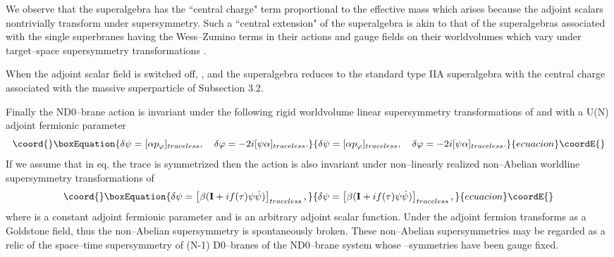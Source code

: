 \documentclass[a4paper,12pt]{article}
\begin{document}
We observe that the superalgebra  has the ``central
charge" term proportional to the effective mass
\coordHE{} which arises because the \coordHE{} adjoint
scalars nontrivially transform
under supersymmetry. Such a ``central extension" of the
superalgebra is akin to that of the superalgebras associated with
the single superbranes having the Wess--Zumino terms in their
actions \cite{central} and gauge fields on their worldvolumes
which vary under target--space supersymmetry transformations
\cite{Sorokin:1997ps}.

When the adjoint scalar field
\myHighlight{$\varphi(\tau)$}\coordHE{} is switched off,
\coordHE{}, \coordHE{} and the superalgebra
 reduces to the standard type IIA superalgebra with the
central charge \coordHE{} associated with the massive superparticle of
Subsection 3.2.

Finally the ND0--brane action  is invariant under the
following rigid worldvolume linear supersymmetry transformations
of
\myHighlight{$\varphi$}\coordHE{} and
\myHighlight{$\psi$}\coordHE{} with a U(N) adjoint fermionic parameter \myHighlight{$\alpha$}\coordHE{}
\begin{equation}\coord{}\boxEquation{\label{abel}
\delta\psi=[\alpha p_\varphi]_{traceless},
\quad \delta \varphi=-2i[\psi\alpha]_{traceless}.
}{\delta\psi=[\alpha p_\varphi]_{traceless},
\quad \delta \varphi=-2i[\psi\alpha]_{traceless}.
}{ecuacion}\coordE{}\end{equation}
If we assume that in eq.  the trace is symmetrized then the
action is also invariant under non--linearly realized non--Abelian
worldline supersymmetry transformations of \myHighlight{$\psi$}\coordHE{}
\begin{equation}\coord{}\boxEquation{\label{nonl}
\delta\psi=\left[\beta({\bf I}+if(\tau)\psi\dot\psi)\right]_{traceless},
}{\delta\psi=\left[\beta({\bf I}+if(\tau)\psi\dot\psi)\right]_{traceless},
}{ecuacion}\coordE{}\end{equation}
where \myHighlight{$\beta$}\coordHE{} is a constant \coordHE{} adjoint fermionic parameter
and \coordHE{} is an arbitrary adjoint scalar function. Under
 the adjoint fermion transforms as a Goldstone
field, thus the non--Abelian supersymmetry  is
spontaneously broken. These non--Abelian supersymmetries may be
regarded as a relic of the  space--time supersymmetry of (N-1)
D0--branes of the ND0--brane system whose \myHighlight{$\kappa$}\coordHE{}--symmetries
have been gauge fixed.
\end{document}
